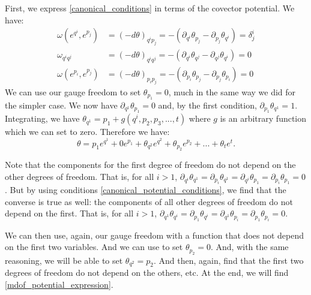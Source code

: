 \documentclass[10pt,twocolumn, nofootinbib]{revtex4-2}
\begin{document}
First, we express \ref{canonical_conditions} in terms of the covector potential. We have:
\begin{equation}\label{canonical_potential_conditions}
\begin{aligned}
	\omega(e^{q^i}, e^{p_j}) &= (-d\theta)_{q^i p_j} = -(\partial_{q^i}\theta_{p_j} - \partial_{p_j}\theta_{q^i}) = \delta^i_j \\
	\omega_{q^i q^j} &= (-d\theta)_{q^i q^j} = -(\partial_{q^i}\theta_{q^j} - \partial_{q^j}\theta_{q^i}) = 0 \\
	\omega(e^{p_i}, e^{p_j}) &= (-d\theta)_{p_i p_j} = -(\partial_{p_i}\theta_{p_j} - \partial_{p_j}\theta_{p_i}) = 0
\end{aligned}
\end{equation}
We can use our gauge freedom to set $\theta_{p_1} = 0$, much in the same way we did for the simpler case. We now have $\partial_{q^1} \theta_{p_1} = 0$ and, by the first condition, $\partial_{p_1} \theta_{q^1} = 1$. Integrating, we have $\theta_{q^1} = p_1 + g(q^i, p_2, p_3, ..., t)$ where $g$ is an arbitrary function which we can set to zero. Therefore we have:
\begin{equation}
	\theta = p_1 e^{q^1} + 0 e^{p_1} + \theta_{q^2} e^{q^2} + \theta_{p_2} e^{p_2} + ... + \theta_{t} e^{t}.
\end{equation}

Note that the components for the first degree of freedom do not depend on the other degrees of freedom. That is, for all $i>1$, $\partial_{q^i} \theta_{q^1} = \partial_{p_i} \theta_{q^1} = \partial_{q^i} \theta_{p_1} = \partial_{p_i} \theta_{p_1} = 0$. But by using conditions \ref{canonical_potential_conditions}, we find that the converse is true as well: the components of all other degrees of freedom do not depend on the first. That is, for all $i>1$, $\partial_{q^1} \theta_{q^i} = \partial_{p_1} \theta_{q^i} = \partial_{q^1} \theta_{p_i} = \partial_{p_1} \theta_{p_i} = 0$.

We can then use, again, our gauge freedom with a function that does not depend on the first two variables. And we can use to set $\theta_{p_2} = 0$. And, with the same reasoning, we will be able to set $\theta_{q^2} = p_2$. And then, again, find that the first two degrees of freedom do not depend on the others, etc. At the end, we will find \ref{mdof_potential_expression}.
\end{document}
